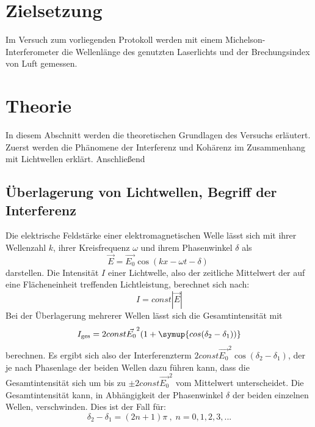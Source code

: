 \section*{Zielsetzung}
\label{sec:zielsetzung}

Im Versuch zum vorliegenden Protokoll werden mit einem Michelson-Interferometer die Wellenlänge des genutzten Laserlichts und der Brechungsindex von Luft gemessen.

\section{Theorie}
\label{sec:Theorie}
In diesem Abschnitt werden die theoretischen Grundlagen des Versuchs erläutert. Zuerst werden die Phänomene der Interferenz und Kohärenz im Zusammenhang mit Lichtwellen erklärt. Anschließend 
\subsection{Überlagerung von Lichtwellen, Begriff der Interferenz}
Die elektrische Feldstärke einer elektromagnetischen Welle lässt sich mit ihrer Wellenzahl $k$, ihrer Kreisfrequenz $\omega$ und ihrem Phasenwinkel $\delta$ als
\begin{equation}
    \label{eqn:emwelle}
    \vec{E} = \vec{E_0} \cos(kx - \omega t - \delta) \; 
\end{equation}
darstellen. \newline
Die Intensität $I$ einer Lichtwelle, also der zeitliche Mittelwert der auf eine Flächeneinheit treffenden Lichtleistung, berechnet sich nach:
\begin{equation}
    \label{eqn:Intensität}
    I = const |\vec{E}|
\end{equation}
Bei der Überlagerung mehrerer Wellen lässt sich die Gesamtintensität mit
\begin{equation}
    I_\text{ges} = 2 const \vec{E_0}^2 (1 + \symup{cos(\delta_2 - \delta_1))}
\end{equation}
berechnen. Es ergibt sich also der Interferenzterm $ 2 const \vec{E_0}^2 \cos(\delta_2 - \delta_1) $, der je nach Phasenlage der beiden Wellen dazu führen kann, dass die Gesamtintensität sich um bis zu $\pm 2 const \vec{E_0}^2 $ vom Mittelwert unterscheidet.
Die Gesamtintensität kann, in Abhängigkeit der Phasenwinkel $\delta$ der beiden einzelnen Wellen, verschwinden. Dies ist der Fall für:
\begin{equation}
    \delta_2 - \delta_1 = (2n + 1)\pi \: , \; n = 0,1,2,3,... 
\end{equation}

